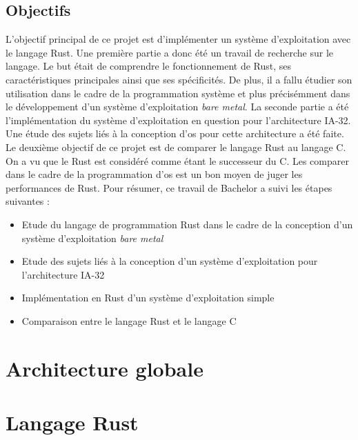 \documentclass[a4paper, 12pt]{article}
\begin{document}
\subsection{Objectifs}
L'objectif principal de ce projet est d'implémenter un système d'exploitation
avec le langage Rust. Une première partie a donc été un travail de recherche
sur le langage. Le but était de comprendre le fonctionnement de Rust, ses caractéristiques
principales ainsi que ses spécificités. De plus, il a fallu étudier son utilisation
dans le cadre de la programmation système et plus précisémment dans le développement
d'un système d'exploitation \textit{bare metal}. La seconde partie a été l'implémentation
du système d'exploitation en question pour l'architecture \acrshort{IA-32}. Une étude
des sujets liés à la conception d'\acrshort{os} pour cette architecture a été faite.
Le deuxième objectif de ce projet est de comparer le langage Rust au langage C.
On a vu que le Rust est considéré comme étant le successeur du C. Les comparer dans
le cadre de la programmation d'\acrshort{os} est un bon moyen de juger les performances
de Rust. Pour résumer, ce travail de Bachelor a suivi les étapes suivantes : \\

\begin{itemize}[label=\textbullet]
	\item Etude du langage de programmation Rust dans le cadre de la conception
    d'un système d'exploitation \textit{bare metal} 
	\item Etude des sujets liés à la conception d'un système d'exploitation pour
    l'architecture \acrshort{IA-32}
	\item Implémentation en Rust d'un système d'exploitation simple
    \item Comparaison entre le langage Rust et le langage C
\end{itemize}


\newpage
\section{Architecture globale}



\newpage
\section{Langage Rust}

\end{document}
